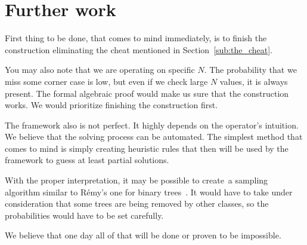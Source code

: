 \documentclass[final]{article}
\theoremstyle{definition}
\theoremstyle{definition}
\theoremstyle{remark}
\begin{document}
\section{Further work}%
\label{sec:further_work}

First thing to be done, that comes to mind immediately, is to finish the construction eliminating the cheat mentioned in Section~\ref{sub:the_cheat}.

You may also note that we are operating on specific \(N\). The probability that we miss some corner case is low, but even if we check large \(N\) values, it is always present. The formal algebraic proof would make us sure that the construction works. We would prioritize finishing the construction first.

The framework also is not perfect. It highly depends on the operator's intuition. We believe that the solving process can be automated. The simplest method that comes to mind is simply creating heuristic rules that then will be used by the framework to guess at least partial solutions.

With the proper interpretation, it may be possible to create~a sampling algorithm similar to Rémy's one for binary trees~\cite{remy,note}. It would have to take under consideration that some trees are being removed by other classes, so the probabilities would have to be set carefully.

We believe that one day all of that will be done or proven to be impossible.

\clearpage

\printbibliography
\end{document}
